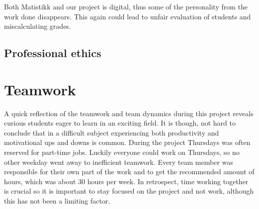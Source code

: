 Both Matistikk and our project is digital, thus some of the personality from the work done disappears. This again could lead to unfair evaluation of students and miscalculating grades.

\subsection{Professional ethics}

\section{Teamwork}
A quick reflection of the teamwork and team dynamics during this project reveals curious students eager to learn in an exciting field. It is though, not hard to conclude that in a difficult subject experiencing both productivity and motivational ups and downs is common. During the project Thursdays was often reserved for part-time jobs. Luckily everyone could work on Thursdays, so no other weekday went away to inefficient teamwork. Every team member was responsible for their own part of the work and to get the recommended amount of hours, which was about 30 hours per week. In retrospect, time working together is crucial so it is important to stay focused on the project and not work, although this has not been a limiting factor.